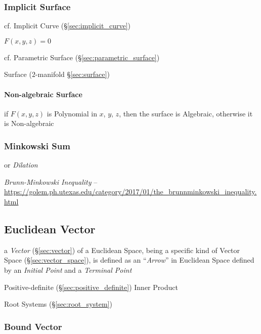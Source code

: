 \subsubsection{Implicit Surface}\label{sec:implicit_surface}

\fist cf. Implicit Curve (\S\ref{sec:implicit_curve})

$F(x,y,z) = 0$

\fist cf. Parametric Surface (\S\ref{sec:parametric_surface})

\fist Surface ($2$-manifold \S\ref{sec:surface})



\paragraph{Non-algebraic Surface}\label{sec:nonalgebraic_surface}\hfill

if $F(x,y,z)$ is Polynomial in $x$, $y$, $z$, then the surface is
Algebraic, otherwise it is Non-algebraic



\subsubsection{Minkowski Sum}\label{sec:minkowski_sum}

or \emph{Dilation}

\emph{Brunn-Minkowski Inequality} --
\url{https://golem.ph.utexas.edu/category/2017/01/the_brunnminkowski_inequality.html}



\subsection{Euclidean Vector}\label{sec:euclidean_vector}

a \emph{Vector} (\S\ref{sec:vector}) of a Euclidean Space, being a specific
kind of Vector Space (\S\ref{sec:vector_space}), is defined as an
``\emph{Arrow}'' in Euclidean Space defined by an \emph{Initial Point} and a
\emph{Terminal Point}

Positive-definite (\S\ref{sec:positive_definite}) Inner Product

\fist Root Systems (\S\ref{sec:root_system})



\subsubsection{Bound Vector}\label{sec:bound_vector}

